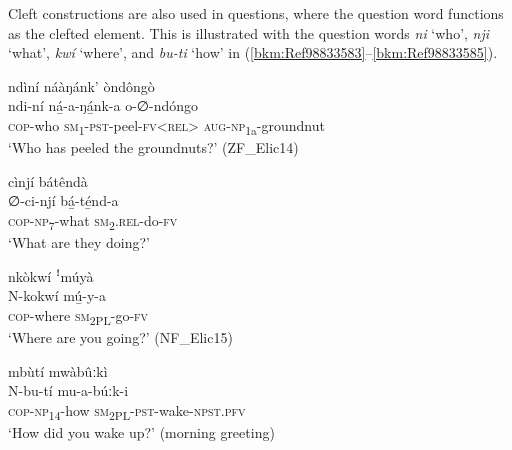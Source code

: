 Cleft constructions are also used in questions, where the question word functions as the clefted element. This is illustrated with the question words \textit{ni} ‘who’, \textit{nji} ‘what’, \textit{kwí} ‘where’, and \textit{bu-ti} ‘how’ in (\ref{bkm:Ref98833583}--\ref{bkm:Ref98833585}).

\ea
\label{bkm:Ref98833583}
ndìní náàŋánk’ òndôngò\\
\gll ndi-ní    ná̲-a-ŋá̲nk-a      o-∅-ndóngo\\
\textsc{cop}-who  \textsc{sm}\textsubscript{1}-\textsc{pst}-peel-\textsc{fv}<\textsc{rel}>  \textsc{aug}-\textsc{np}\textsubscript{1a}-groundnut\\
\glt ‘Who has peeled the groundnuts?’ (ZF\_Elic14)
\z

\ea
cìnjí bátêndà\\
\gll ∅-ci-njí    bá̲-té̲nd-a\\
\textsc{cop}-\textsc{np}\textsubscript{7}-what  \textsc{sm}\textsubscript{2}.\textsc{rel}-do-\textsc{fv}\\
\glt ‘What are they doing?’
\z

\ea
nkòkwí ꜝmúyà\\
\gll N-kokwí  mú̲-y-a\\
\textsc{cop}-where  \textsc{sm}\textsubscript{2PL}-go-\textsc{fv}\\
\glt ‘Where are you going?’ (NF\_Elic15)
\z

\ea
\label{bkm:Ref98833585}
mbùtí mwàbûːkì\\
\gll N-bu-tí    mu-a-búːk-i\\
\textsc{cop}-\textsc{np}\textsubscript{14}-how  \textsc{sm}\textsubscript{2PL}-\textsc{pst}-wake-\textsc{npst}.\textsc{pfv}\\
\glt ‘How did you wake up?’ (morning greeting)
\z

